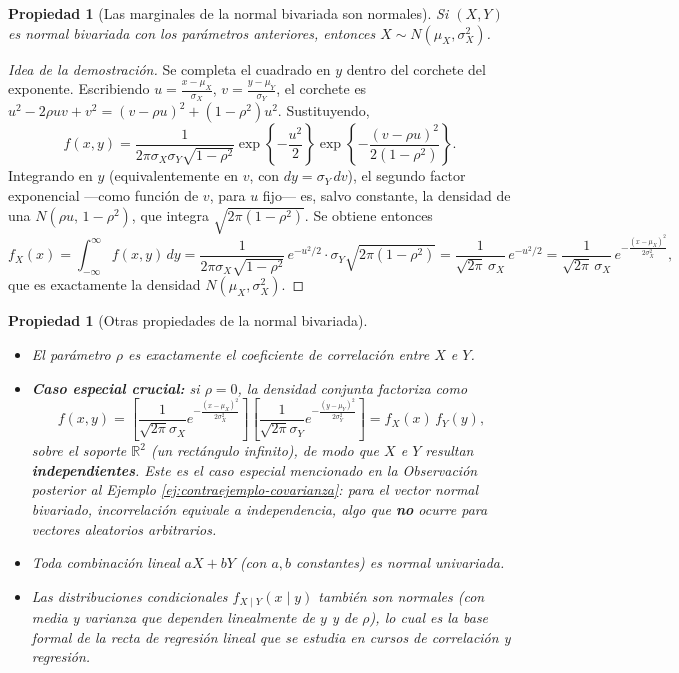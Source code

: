 \documentclass[11pt,a4paper]{article}
\theoremstyle{plain}
\newtheorem{propiedad}[teorema]{Propiedad}
\theoremstyle{definition}
\theoremstyle{remark}
\begin{document}
\begin{propiedad}[Las marginales de la normal bivariada son normales]\label{prop:marginal-normal-bivariada}
Si $(X,Y)$ es normal bivariada con los parámetros anteriores, entonces $X\sim N(\mu_X,\sigma_X^2)$.
\end{propiedad}

\begin{proof}[Idea de la demostración]
Se completa el cuadrado en $y$ dentro del corchete del exponente. Escribiendo $u=\frac{x-\mu_X}{\sigma_X}$, $v=\frac{y-\mu_Y}{\sigma_Y}$, el corchete es $u^2-2\rho uv+v^2 = (v-\rho u)^2+(1-\rho^2)u^2$. Sustituyendo,
\[
f(x,y) = \frac{1}{2\pi\sigma_X\sigma_Y\sqrt{1-\rho^2}}\exp\left\{-\frac{u^2}{2}\right\}\exp\left\{-\frac{(v-\rho u)^2}{2(1-\rho^2)}\right\}.
\]
Integrando en $y$ (equivalentemente en $v$, con $dy=\sigma_Y\,dv$), el segundo factor exponencial —como función de $v$, para $u$ fijo— es, salvo constante, la densidad de una $N(\rho u,\,1-\rho^2)$, que integra $\sqrt{2\pi(1-\rho^2)}$. Se obtiene entonces
\[
f_X(x) = \int_{-\infty}^{\infty} f(x,y)\,dy = \frac{1}{2\pi\sigma_X\sqrt{1-\rho^2}}\, e^{-u^2/2}\cdot\sigma_Y\sqrt{2\pi(1-\rho^2)} = \frac{1}{\sqrt{2\pi}\,\sigma_X}\,e^{-u^2/2} = \frac{1}{\sqrt{2\pi}\,\sigma_X}\,e^{-\frac{(x-\mu_X)^2}{2\sigma_X^2}},
\]
que es exactamente la densidad $N(\mu_X,\sigma_X^2)$.
\end{proof}

\begin{propiedad}[Otras propiedades de la normal bivariada]
\begin{itemize}
\item El parámetro $\rho$ es exactamente el coeficiente de correlación entre $X$ e $Y$.
\item \textbf{Caso especial crucial:} si $\rho=0$, la densidad conjunta factoriza como
\[
f(x,y) = \left[\frac{1}{\sqrt{2\pi}\sigma_X}e^{-\frac{(x-\mu_X)^2}{2\sigma_X^2}}\right]\left[\frac{1}{\sqrt{2\pi}\sigma_Y}e^{-\frac{(y-\mu_Y)^2}{2\sigma_Y^2}}\right] = f_X(x)\,f_Y(y),
\]
sobre el soporte $\mathbb R^2$ (un rectángulo infinito), de modo que $X$ e $Y$ resultan \textbf{independientes}. Este es el caso especial mencionado en la Observación posterior al Ejemplo \ref{ej:contraejemplo-covarianza}: para el vector normal bivariado, incorrelación equivale a independencia, algo que \textbf{no} ocurre para vectores aleatorios arbitrarios.
\item Toda combinación lineal $aX+bY$ (con $a,b$ constantes) es normal univariada.
\item Las distribuciones condicionales $f_{X\mid Y}(x\mid y)$ también son normales (con media y varianza que dependen linealmente de $y$ y de $\rho$), lo cual es la base formal de la recta de regresión lineal que se estudia en cursos de correlación y regresión.
\end{itemize}
\end{propiedad}
\end{document}
